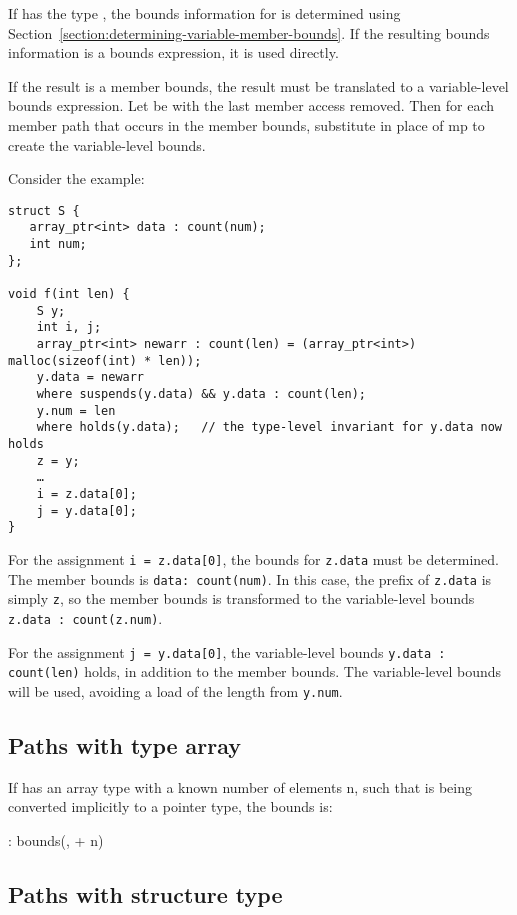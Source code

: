 If  has the type \arrayptr, the bounds information for
 is determined using 
Section~\ref{section:determining-variable-member-bounds}. If the resulting bounds
information is a bounds expression, it is used directly.

If the result is a member bounds, the result must be translated to a
variable-level bounds expression. Let  be  with the
last member access removed. Then for each member path  that
occurs in the member bounds, substitute  in place of mp
to create the variable-level bounds.

Consider the example:
\begin{verbatim}
struct S {
   array_ptr<int> data : count(num);
   int num;
};

void f(int len) {
    S y;
    int i, j;
    array_ptr<int> newarr : count(len) = (array_ptr<int>) malloc(sizeof(int) * len));
    y.data = newarr
    where suspends(y.data) && y.data : count(len);
    y.num = len
    where holds(y.data);   // the type-level invariant for y.data now holds
    z = y;
    …
    i = z.data[0];
    j = y.data[0];
}
\end{verbatim}

For the assignment \texttt{i = z.data[0]}, the bounds for
\texttt{z.data} must be determined. The member bounds is \texttt{data:
count(num)}. In this case, the prefix of \texttt{z.data} is simply
\texttt{z}, so the member bounds is transformed to the variable-level
bounds \texttt{z.data : count(z.num)}.

For the assignment \texttt{j = y.data[0]}, the variable-level bounds
\texttt{y.data : count(len)} holds, in addition to the member bounds.
The variable-level bounds will be used, avoiding a load of the length
from \texttt{y.num}.

\subsection{Paths with type array}\label{paths-with-type-array}

If  has an array type with a known number of elements n,
such that  is being converted implicitly to a pointer type,
the bounds is:

 : bounds(,  + n)

\subsection{Paths with structure type}\label{paths-with-structure-type}

